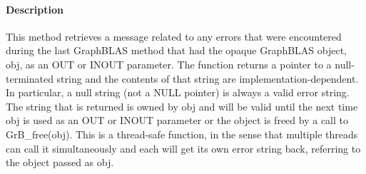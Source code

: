 \paragraph{Description}

This method retrieves a message related to any errors that were encountered 
during the last GraphBLAS method that had the opaque GraphBLAS object, 
{\sf obj}, as an {\sf OUT} or {\sf INOUT} parameter.   The function returns a 
pointer to a null-terminated string and the contents of that string are 
implementation-dependent.  In particular, a null 
string (not a {\sf NULL} pointer) is always a valid error string.  The string 
that is returned is owned by {\sf obj} and will be valid until the next time 
{\sf obj} is used as an {\sf OUT} or {\sf INOUT} parameter or the object is freed
by a call to {\sf GrB\_free(obj)}.
{\color{red}
This is a thread-safe function, in the sense that multiple threads can call it
simultaneously and each will get its own error string back, referring to the
object passed as {\sf obj}.}  
